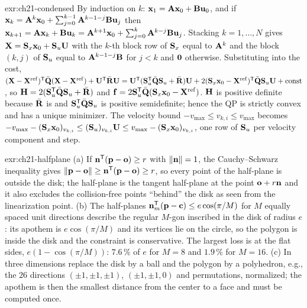 \begin{solution}{exr:ch21-condensed}
By induction on $k$: $\mathbf{x}_1=\mathbf{A}\mathbf{x}_0+\mathbf{B}\mathbf{u}_0$, and if $\mathbf{x}_k=\mathbf{A}^k\mathbf{x}_0+\sum_{j=0}^{k-1}\mathbf{A}^{k-1-j}\mathbf{B}\mathbf{u}_j$ then $\mathbf{x}_{k+1}=\mathbf{A}\mathbf{x}_k+\mathbf{B}\mathbf{u}_k=\mathbf{A}^{k+1}\mathbf{x}_0+\sum_{j=0}^{k}\mathbf{A}^{k-j}\mathbf{B}\mathbf{u}_j$. Stacking $k=1,\dots,N$ gives $\mathbf{X}=\mathbf{S}_x\mathbf{x}_0+\mathbf{S}_u\mathbf{U}$ with the $k$-th block row of $\mathbf{S}_x$ equal to $\mathbf{A}^k$ and the block $(k,j)$ of $\mathbf{S}_u$ equal to $\mathbf{A}^{k-1-j}\mathbf{B}$ for $j<k$ and $\mathbf{0}$ otherwise. Substituting into the cost, $(\mathbf{X}-\mathbf{X}^{\mathrm{ref}})^{\mathsf{T}}\bar{\mathbf{Q}}(\mathbf{X}-\mathbf{X}^{\mathrm{ref}})+\mathbf{U}^{\mathsf{T}}\bar{\mathbf{R}}\mathbf{U}=\mathbf{U}^{\mathsf{T}}(\mathbf{S}_u^{\mathsf{T}}\bar{\mathbf{Q}}\mathbf{S}_u+\bar{\mathbf{R}})\mathbf{U}+2(\mathbf{S}_x\mathbf{x}_0-\mathbf{X}^{\mathrm{ref}})^{\mathsf{T}}\bar{\mathbf{Q}}\mathbf{S}_u\mathbf{U}+\text{const}$, so $\mathbf{H}=2(\mathbf{S}_u^{\mathsf{T}}\bar{\mathbf{Q}}\mathbf{S}_u+\bar{\mathbf{R}})$ and $\mathbf{f}=2\mathbf{S}_u^{\mathsf{T}}\bar{\mathbf{Q}}(\mathbf{S}_x\mathbf{x}_0-\mathbf{X}^{\mathrm{ref}})$. $\mathbf{H}$ is positive definite because $\bar{\mathbf{R}}$ is and $\mathbf{S}_u^{\mathsf{T}}\bar{\mathbf{Q}}\mathbf{S}_u$ is positive semidefinite; hence the QP is strictly convex and has a unique minimizer. The velocity bound $-v_{\max}\le v_{k,i}\le v_{\max}$ becomes $-v_{\max}-(\mathbf{S}_x\mathbf{x}_0)_{v_{k,i}}\le(\mathbf{S}_u)_{v_{k,i}}\mathbf{U}\le v_{\max}-(\mathbf{S}_x\mathbf{x}_0)_{v_{k,i}}$, one row of $\mathbf{S}_u$ per velocity component and step.
\end{solution}
\begin{solution}{exr:ch21-halfplane}
(a) If $\mathbf{n}^{\mathsf{T}}(\mathbf{p}-\mathbf{o})\ge r$ with $\left\lVert \mathbf{n} \right\rVert=1$, the Cauchy--Schwarz inequality gives $\left\lVert \mathbf{p}-\mathbf{o} \right\rVert\ge\mathbf{n}^{\mathsf{T}}(\mathbf{p}-\mathbf{o})\ge r$, so every point of the half-plane is outside the disk; the half-plane is the tangent half-plane at the point $\mathbf{o}+r\mathbf{n}$ and it also excludes the collision-free points ``behind'' the disk as seen from the linearization point. (b) The half-planes $\mathbf{n}_m^{\mathsf{T}}(\mathbf{p}-\mathbf{c})\le e\cos(\pi/M)$ for $M$ equally spaced unit directions describe the regular $M$-gon inscribed in the disk of radius $e$: its apothem is $e\cos(\pi/M)$ and its vertices lie on the circle, so the polygon is inside the disk and the constraint is conservative. The largest loss is at the flat sides, $e(1-\cos(\pi/M))$: $7.6\,\%$ of $e$ for $M=8$ and $1.9\,\%$ for $M=16$. (c) In three dimensions replace the disk by a ball and the polygon by a polyhedron, e.g., the $26$ directions $(\pm1,\pm1,\pm1)$, $(\pm1,\pm1,0)$ and permutations, normalized; the apothem is then the smallest distance from the center to a face and must be computed once.
\end{solution}

